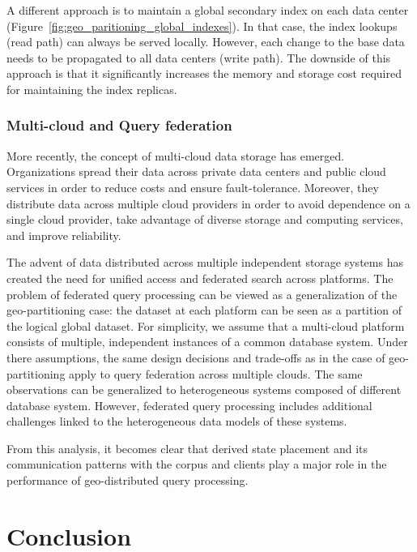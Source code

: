 A different approach is to maintain a global secondary index on each data center (Figure~\ref{fig:geo_paritioning_global_indexes}).
In that case, the index lookups (read path) can always be served locally.
However, each change to the base data needs to be propagated to all data centers (write path).
The downside of this approach is that it significantly increases the memory and storage cost required for maintaining the
index replicas.

\subsubsection{Multi-cloud and Query federation}
More recently, the concept of multi-cloud data storage has emerged.
Organizations spread their data across private data centers and public cloud services in order to reduce costs and
ensure fault-tolerance.
Moreover, they distribute data across multiple cloud providers in order to avoid dependence on a single
cloud provider, take advantage of diverse storage and computing services, and improve reliability.

The advent of data distributed across multiple independent storage systems has created the need for unified access and
federated search across platforms.
The problem of federated query processing can be viewed as a generalization of the geo-partitioning case:
the dataset at each platform can be seen as a partition of the logical global dataset.
For simplicity, we assume that a multi-cloud platform consists of multiple, independent instances of a common database
system.
Under there assumptions, the same design decisions and trade-offs as in the case of geo-partitioning apply to query
federation across multiple clouds.
The same observations can be generalized to heterogeneous systems composed of different database system.
However, federated query processing includes additional challenges linked to the heterogeneous data models of these
systems.

From this analysis, it becomes clear that derived state placement and its communication patterns with the corpus and
clients play a major role in the performance of geo-distributed query processing.

\section{Conclusion}


